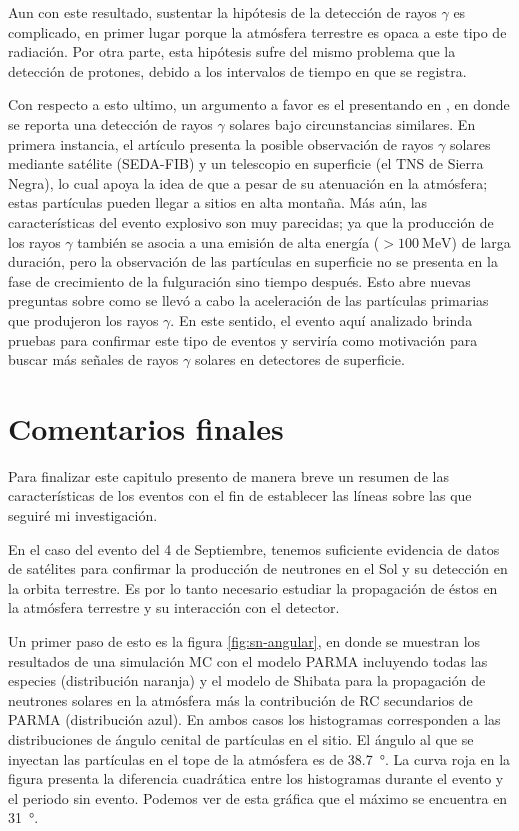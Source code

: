 Aun con este resultado, sustentar la hipótesis de la detección de rayos $\gamma$ es complicado, en primer lugar porque la atmósfera terrestre es opaca a este tipo de radiación. Por otra parte, esta hipótesis sufre del mismo problema que la detección de protones, debido a los intervalos de tiempo en que se registra.

Con respecto a esto ultimo, un argumento a favor es el presentando en \cite{muraki20}, en donde se reporta una detección de rayos $\gamma$ solares bajo circunstancias similares. En primera instancia, el artículo presenta la posible observación de rayos $\gamma$ solares mediante satélite (SEDA-FIB) y un telescopio en superficie (el TNS de Sierra Negra), lo cual apoya la idea de que a pesar de su atenuación en la atmósfera; estas partículas pueden llegar a sitios en alta montaña. Más aún, las características del evento explosivo son muy parecidas; ya que la producción de los rayos $\gamma$ también se asocia a una emisión de alta energía ($>\SI{100}{\mega\electronvolt}$) de larga duración, pero la observación de las partículas en superficie no se presenta en la fase de crecimiento de la fulguración sino tiempo después. Esto abre nuevas preguntas sobre como se llevó a cabo la aceleración de las partículas primarias que produjeron los rayos $\gamma$. En este sentido, el evento aquí analizado brinda pruebas para confirmar este tipo de eventos y serviría como motivación para buscar más señales de rayos $\gamma$ solares en detectores de superficie.

\section{Comentarios finales}

Para finalizar este capitulo presento de manera breve un resumen de las características de los eventos con el fin de establecer las líneas sobre las que seguiré mi investigación.

En el caso del evento del \num{4} de Septiembre, tenemos suficiente evidencia de datos de satélites para confirmar la producción de neutrones en el Sol y su detección en la orbita terrestre. Es por lo tanto necesario estudiar la propagación de éstos en la atmósfera terrestre y su interacción con el detector.

Un primer paso de esto es la figura \ref{fig:sn-angular}, en donde se muestran los resultados de una simulación MC con el modelo PARMA incluyendo todas las especies (distribución naranja) y el modelo de Shibata para la propagación de neutrones solares en la atmósfera más la contribución de RC secundarios de PARMA (distribución azul). En ambos casos los histogramas corresponden a las distribuciones de ángulo cenital de partículas en el sitio. El ángulo al que se inyectan las partículas en el tope de la atmósfera es de \SI{38.7}{\degree}. La curva roja en la figura presenta la diferencia cuadrática entre los histogramas durante el evento y el periodo sin evento. Podemos ver de esta gráfica que el máximo se encuentra en  \SI{31}{\degree}.

